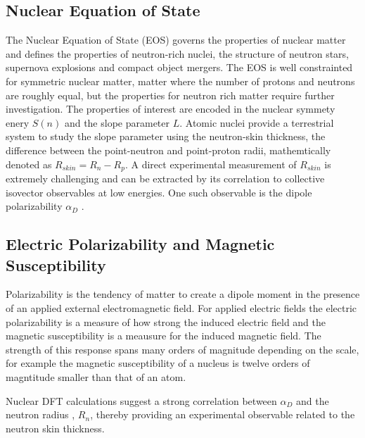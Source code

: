 \documentclass[cnatzke_thesis_proposal.tex]{subfiles}
\begin{document}
    \subsection{Nuclear Equation of State}
The Nuclear Equation of State (EOS) governs the properties of nuclear matter and defines the properties of neutron-rich nuclei, the structure of neutron stars, supernova explosions and compact object mergers. \cite{Kaufmann2020} The EOS is well constrainted for symmetric nuclear matter, matter where the number of protons and neutrons are roughly equal, but the properties for neutron rich matter require further investigation. \cite{Danielewicz2002} The properties of interest are encoded in the nuclear symmety enery $S(n)$ and the slope parameter $L$. Atomic nuclei provide a terrestrial system to study the slope parameter using the neutron-skin thickness, the difference between the point-neutron and point-proton radii, mathemtically denoted as $R_{skin} = R_n - R_p$. \cite{Tsang2012} A direct experimental measurement of $R_{skin}$ is extremely challenging and can be extracted by its correlation to collective isovector observables at low energies. \cite{Birkhan2017} One such observable is the dipole polarizability $\alpha_D$ \cite{Birkhan2017}.

    \subsection{Electric Polarizability and Magnetic Susceptibility}
Polarizability is the tendency of matter to create a dipole moment in the presence of an applied external electromagnetic field. For applied electric fields the electric polarizability is a measure of how strong the induced electric field and the magnetic susceptibility is a meausure for the induced magnetic field. \cite{Garg2012} The strength of this response spans many orders of magnitude depending on the scale, for example the magnetic susceptibility of a nucleus is twelve orders of magntitude smaller than that of an atom. \cite{Knupfer1985}

Nuclear DFT calculations suggest a strong correlation between $\alpha_D$ and the neutron radius , $R_{n}$, thereby providing an experimental observable related to the neutron skin thickness.  \cite{Hagen2016}
\end{document}
